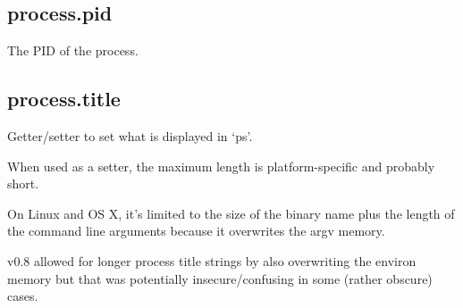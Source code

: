 \begin{Shaded}
\begin{Highlighting}[]
\NormalTok{(}\NormalTok{, }\NormalTok{() \{}
  \NormalTok{(}\NormalTok{);}
\NormalTok{\});}

\NormalTok{() \{}
  \NormalTok{(}\NormalTok{);}
  \NormalTok{(}\NormalTok{);}
\NormalTok{\}, }\NormalTok{);}

\NormalTok{(}\NormalTok{, }\NormalTok{);}
\end{Highlighting}
\end{Shaded}

\subsection{process.pid}

The PID of the process.

\begin{Shaded}
\begin{Highlighting}[]
\NormalTok{(} \NormalTok{+ }\NormalTok{);}
\end{Highlighting}
\end{Shaded}

\subsection{process.title}

Getter/setter to set what is displayed in `ps'.

When used as a setter, the maximum length is platform-specific and
probably short.

On Linux and OS X, it's limited to the size of the binary name plus the
length of the command line arguments because it overwrites the argv
memory.

v0.8 allowed for longer process title strings by also overwriting the
environ memory but that was potentially insecure/confusing in some
(rather obscure) cases.

